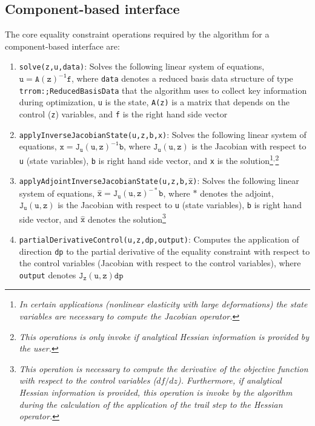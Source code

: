     \subsection{Component-based interface}\label{subsec:EqualityComponentAPI}
    
    The core equality constraint operations required by the algorithm for a component-based interface are: 
    
    \begin{enumerate}
    \item \texttt{solve(z,u,data)}: Solves the following linear system of equations, $\mathtt{u=A(z)^{-1}f}$, where \texttt{data} denotes a reduced basis data structure of type \texttt{trrom:;ReducedBasisData} that the algorithm uses to collect key information during optimization, \texttt{u} is the state, \texttt{A(z)} is a matrix that depends on the control (\texttt{z}) variables, and \texttt{f} is the right hand side vector
    \item \texttt{applyInverseJacobianState(u,z,b,x)}: Solves the following linear system of equations, $\mathtt{x=J_u(u,z)^{-1}b}$, where $\mathtt{J_u(u,z)}$ is the Jacobian with respect to \texttt{u} (state variables), \texttt{b} is right hand side vector, and \texttt{x} is the solution\footnote{\emph{In certain applications (nonlinear elasticity with large deformations) the state variables are necessary to compute the Jacobian operator.}}$^,$\footnote{\emph{This operations is only invoke if analytical Hessian information is provided by the user.}}
    \item \texttt{applyAdjointInverseJacobianState(u,z,b,$\mathtt{\hat{x}}$)}: Solves the following linear system of equations, $\mathtt{\hat{x}=J_u(u,z)^{-\ast}b}$, where $\ast$ denotes the adjoint, $\mathtt{J_u(u,z)}$ is the Jacobian with respect to \texttt{u} (state variables), \texttt{b} is right hand side vector, and $\mathtt{\hat{x}}$ denotes the solution\footnote{\emph{This operation is necessary to compute the derivative of the objective function with respect to the control variables ($df/dz$). Furthermore, if analytical Hessian information is provided, this operation is invoke by the algorithm during the calculation of the application of the trail step to the Hessian operator.}}
    \item \texttt{partialDerivativeControl(u,z,dp,output)}: Computes the application of direction \texttt{dp} to the partial derivative of the equality constraint with respect to the control variables (Jacobian with respect to the control variables), where \texttt{output} denotes $\mathtt{J_z(u,z)dp}$

\end{enumerate}
